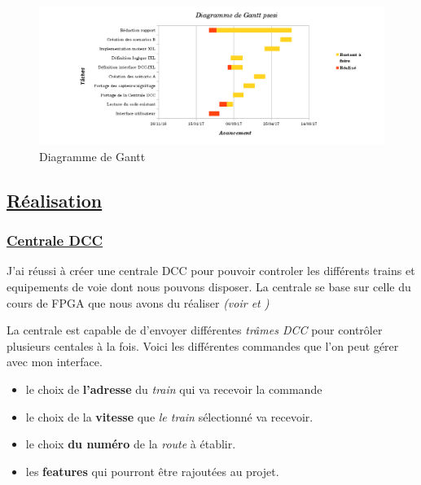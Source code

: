 \begin{figure}[h]
\centering
\includegraphics[scale=0.5]{gantt.png}
\caption{Diagramme de Gantt}
\label{gantt}
\end{figure}




\subsection{\underline{Réalisation}}
\label{sec:Réal}

\subsubsection{\underline{Centrale DCC}}
\label{sec:Centrale}

J'ai réussi à créer une centrale DCC pour pouvoir controler les
différents trains et equipements de voie dont nous pouvons
disposer. La centrale se base sur celle du cours de FPGA que nous
avons du réaliser \emph{(voir \cite{rapport} et \cite{sujet})}

La centrale est capable de d'envoyer différentes \emph{trâmes DCC}
pour contrôler plusieurs centales à la fois. Voici les différentes
commandes que l'on peut gérer avec mon interface.


\begin{itemize}
    \item le choix de \textbf{l'adresse} du \emph{train} qui va
      recevoir la commande
    \item le choix de la \textbf{vitesse} que \emph{le train} s\'electionn\'e
      va recevoir. 
    \item le choix  \textbf{du numéro} de la \emph{route} \`a \'etablir.
    \item les \textbf{features} qui pourront \^etre rajout\'ees au
      projet. 
  \end{itemize}

\newpage

